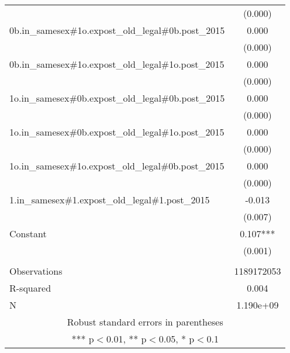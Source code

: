 \documentclass[]{article}
\begin{document}
\begin{tabular}{lc}
 & (0.000) \\
0b.in\_samesex\#1o.expost\_old\_legal\#0b.post\_2015 & 0.000 \\
 & (0.000) \\
0b.in\_samesex\#1o.expost\_old\_legal\#1o.post\_2015 & 0.000 \\
 & (0.000) \\
1o.in\_samesex\#0b.expost\_old\_legal\#0b.post\_2015 & 0.000 \\
 & (0.000) \\
1o.in\_samesex\#0b.expost\_old\_legal\#1o.post\_2015 & 0.000 \\
 & (0.000) \\
1o.in\_samesex\#1o.expost\_old\_legal\#0b.post\_2015 & 0.000 \\
 & (0.000) \\
1.in\_samesex\#1.expost\_old\_legal\#1.post\_2015 & -0.013 \\
 & (0.007) \\
Constant & 0.107*** \\
 & (0.001) \\
 &  \\
Observations & 1189172053 \\
R-squared & 0.004 \\
 N & 1.190e+09 \\ \hline
\multicolumn{2}{c}{ Robust standard errors in parentheses} \\
\multicolumn{2}{c}{ *** p$<$0.01, ** p$<$0.05, * p$<$0.1} \\
\end{tabular}
\end{document}
